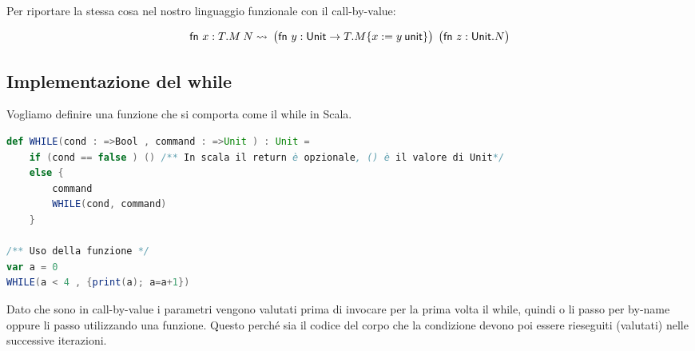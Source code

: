 Per riportare la stessa cosa nel nostro linguaggio funzionale con il call-by-value:

$$
\fn x:T.M \: N \rightsquigarrow \: \big(\fn y : \text{Unit} \rightarrow T . M\{x := y \: \text{unit}\} \big) \:\:  \big(\fn z : \text{Unit} . N \big)
$$

\subsection{Implementazione del while}

Vogliamo definire una funzione che si comporta come il while in Scala.

\begin{lstlisting}[language=Scala, caption=I parametri devono essere dichiarati come call-by-name oppure  ]
def WHILE(cond : =>Bool , command : =>Unit ) : Unit = 
	if (cond == false ) () /** In scala il return è opzionale, () è il valore di Unit*/
	else {
		command
		WHILE(cond, command)
	}

/** Uso della funzione */
var a = 0
WHILE(a < 4 , {print(a); a=a+1})
\end{lstlisting}

\noindent Dato che sono in call-by-value i parametri vengono valutati prima di invocare per la prima volta il while, quindi o li passo per by-name oppure li passo utilizzando una funzione. 
Questo perché sia il codice del corpo che la condizione devono poi essere rieseguiti (valutati) nelle successive iterazioni. 


